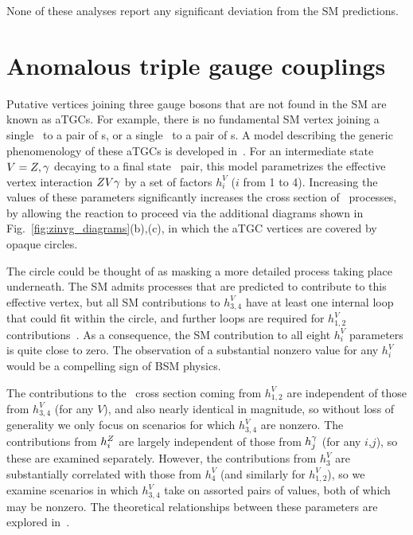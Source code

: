 \documentclass[oneside, letterpaper, 12pt, oldfontcommands]{memoir}
\begin{document}
None of these analyses report any significant deviation from the SM predictions.

\section{Anomalous triple gauge couplings} \label{sec:introduction_aTGC}
Putative vertices joining three gauge bosons that are not found in the SM are known as aTGCs. For example, there is no fundamental SM vertex
joining a single \Pgamma\ to a pair of \PZ s, or a single \PZ\ to a pair of \Pgamma s. A model
describing the generic phenomenology of these aTGCs is developed in~\cite{ref:Nucl.Phys.0550-3213_87_90685-7, ref:PhysRevD.47.4889, ref:PhysRevD.62.113011}.
For an intermediate state $V = Z,\gamma$ decaying to a final state \PZ\Pgamma\ pair, this model parametrizes the effective vertex interaction $Z V\gamma$
by a set of factors $h_{i}^{V}$ ($i$ from 1 to 4). Increasing the values of these parameters significantly increases the cross section
of \zinvg\ processes, by allowing the reaction to proceed via the additional diagrams shown in Fig.~\ref{fig:zinvg_diagrams}(b),(c),
in which the aTGC vertices are covered by opaque circles.

The circle could be thought of as masking a more detailed process taking place underneath. The SM admits processes that are predicted to contribute
to this effective vertex, but all SM contributions to $h_{3,4}^{V}$ have at least one internal loop that could fit within the circle, and
further loops are required for $h_{1,2}^{V}$ contributions~\cite{ref:PhysRevD.47.4889}.
As a consequence, the SM contribution to all eight $h_{i}^{V}$ parameters is quite close to zero.
The observation of a substantial nonzero value for any $h_{i}^{V}$ would be a compelling sign of BSM physics.

The contributions to the \zinvg\ cross section coming from $h_{1,2}^{V}$ are independent of those from $h_{3,4}^{V}$ (for any $V$), and also nearly identical
in magnitude, so without loss of generality we only focus on scenarios for which $h_{3,4}^{V}$ are nonzero. The contributions
from $h_{i}^{Z}$ are largely independent of those from $h_{j}^{\gamma}$ (for any $i$,$j$), so these are examined separately.
However, the contributions from $h_{3}^{V}$ are substantially correlated with those from $h_{4}^{V}$ (and similarly for $h_{1,2}^{V}$), so we examine
scenarios in which $h_{3,4}^{V}$ take on assorted pairs of values, both of which may be nonzero. The theoretical relationships between these parameters
are explored in~\cite{ref:PhysRevD.47.4889}.
\end{document}
